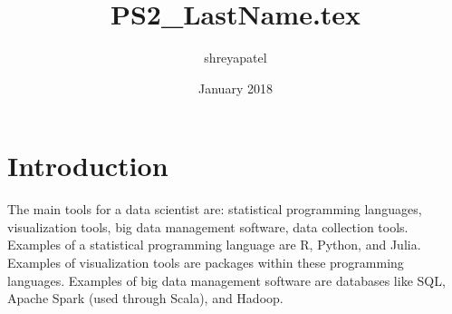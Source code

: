 \documentclass{article}
\title{PS2_LastName.tex}
\author{shreyapatel }
\date{January 2018}
\begin{document}
\maketitle

\section{Introduction}
The main tools for a data scientist are: statistical programming languages, visualization tools, big data management software, data collection tools. Examples of a statistical programming language are R, Python, and Julia. Examples of visualization tools are packages within these programming languages. Examples of big data management software are databases like SQL, Apache Spark (used through Scala), and Hadoop. 
\end{document}
